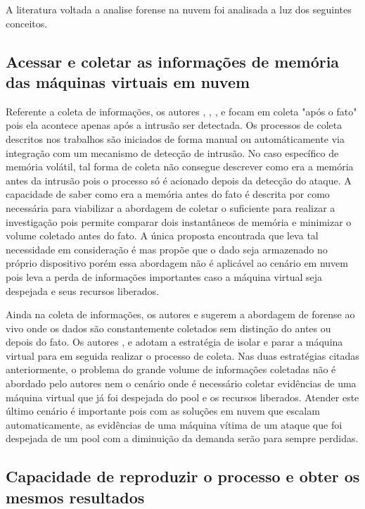 \documentclass[conference]{IEEEtran}
\begin{document}
A literatura voltada a analise forense na nuvem foi analisada a luz dos seguintes conceitos. 

\subsection{Acessar e coletar as informações de memória das máquinas virtuais em nuvem}

Referente a coleta de informações, os autores \cite{Reichert2015}, \cite{Poisel2013}, \cite{Dykstra2013}, \cite{George2012} e \cite{Sang2013} focam em coleta "após o fato" pois ela acontece apenas após a intrusão ser detectada. 
%
Os processos de coleta descritos nos trabalhos são iniciados de forma manual ou automáticamente via integração com um mecanismo de detecção de intrusão. 
%
No caso específico de memória volátil, tal forma de coleta não consegue descrever como era a memória antes da intrusão pois o processo só é acionado depois da detecção do ataque. 
%
A capacidade de saber como era a memória antes do fato é descrita por \cite{Case2014} como necessária para viabilizar a abordagem de coletar o suficiente para realizar a investigação pois permite comparar dois instantâneos de memória e minimizar o volume coletado antes do fato. 
%
A única proposta encontrada que leva tal necessidade em consideração é \cite{Dezfouli2012} mas propõe que o dado seja armazenado no próprio dispositivo porém essa abordagem não é aplicável ao cenário em nuvem pois leva a perda de informações importantes caso a máquina virtual seja despejada e seus recursos liberados.

Ainda na coleta de informações, os autores \cite{Reichert2015} e \cite{George2012} sugerem a abordagem de forense ao vivo onde os dados são constantemente coletados sem distinção do antes ou depois do fato. 
%
Os autores \cite{Poisel2013}, \cite{Dykstra2013} e \cite{Sang2013} adotam a estratégia de isolar e parar a máquina virtual para em seguida realizar o processo de coleta. 
%
Nas duas estratégias citadas anteriormente, o problema do grande volume de informações coletadas não é abordado pelo autores nem o cenário onde é necessário coletar evidências de uma máquina virtual que já foi despejada do pool e os recursos liberados. 
%
Atender este último cenário é importante pois com as soluções em nuvem que escalam automaticamente, as evidências de uma máquina vítima de um ataque que foi despejada de um pool com a diminuição da demanda serão para sempre perdidas. 

\subsection{Capacidade de reproduzir o processo e obter os mesmos resultados}
\end{document}
